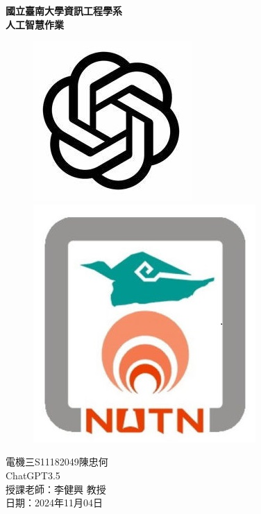 \setmainfont{Times New Roman}  %
\begin{titlepage}
    \centering
    {\Huge \textbf{國立臺南大學資訊工程學系\\人工智慧作業}}\\[2cm] %
    \begin{figure}[htbp]
        \centering
        \includegraphics[width=0.3\linewidth]{images/chatgpt.jpg} 
        \hspace{2cm}
        \includegraphics[width=0.3\linewidth]{images/NUTN_LOGO.jpg}
    \end{figure} 
    \vspace{2cm}
    {\Large 電機三\hspace{1em}S11182049\hspace{1em}陳忠何}\\[0.5cm] 
    {\Large ChatGPT3.5}\\[0.5cm]
    \vfill
    {\Large 授課老師：李健興 教授}\\[1cm] %
    {\Large 日期：2024年11月04日}\\[2cm] %
\end{titlepage} 
